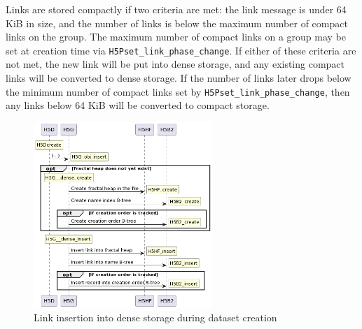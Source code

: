 Links are stored compactly if two criteria are met: the link message is under 64 KiB in size, and the number of links is below the maximum number of compact links on the group. The maximum number of compact links on a group may be set at creation time via \texttt{H5Pset\_link\_phase\_change}. If either of these criteria are not met, the new link will be put into dense storage, and any existing compact links will be converted to dense storage. If the number of links later drops below the minimum number of compact links set by \texttt{H5Pset\_link\_phase\_change}, then any links below 64 KiB will be converted to compact storage.

\begin{figure}
    \centering
    \includegraphics[width=0.6\textwidth]{images/tour_4_uml_link_storage_dense.png}
    \caption{Link insertion into dense storage during dataset creation}
    \label{fig:tour-4-uml-link-storage-dense}
\end{figure}



